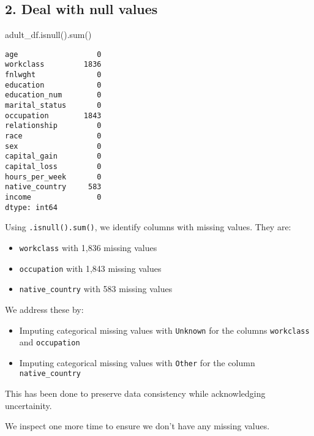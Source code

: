 \documentclass[
  letterpaper,
  DIV=11,
  numbers=noendperiod]{scrartcl}
\newenvironment{Shaded}{\begin{snugshade}}{\end{snugshade}}
\newcommand{\BuiltInTok}[1]{\textcolor[rgb]{0.00,0.23,0.31}{#1}}
\newcommand{\NormalTok}[1]{\textcolor[rgb]{0.00,0.23,0.31}{#1}}
\providecommand{\tightlist}{%
  \setlength{\itemsep}{0pt}\setlength{\parskip}{0pt}}
\begin{document}
\subsection{2. Deal with null values}\label{deal-with-null-values}

\begin{Shaded}
\begin{Highlighting}[]
\NormalTok{adult\_df.isnull().}\BuiltInTok{sum}\NormalTok{()}
\end{Highlighting}
\end{Shaded}

\begin{verbatim}
age                  0
workclass         1836
fnlwght              0
education            0
education_num        0
marital_status       0
occupation        1843
relationship         0
race                 0
sex                  0
capital_gain         0
capital_loss         0
hours_per_week       0
native_country     583
income               0
dtype: int64
\end{verbatim}

Using \texttt{.isnull().sum()}, we identify columns with missing values.
They are:

\begin{itemize}
\tightlist
\item
  \texttt{workclass} with 1,836 missing values
\item
  \texttt{occupation} with 1,843 missing values
\item
  \texttt{native\_country} with 583 missing values
\end{itemize}

We address these by:

\begin{itemize}
\tightlist
\item
  Imputing categorical missing values with \texttt{Unknown} for the
  columns \texttt{workclass} and \texttt{occupation}
\item
  Imputing categorical missing values with \texttt{Other} for the column
  \texttt{native\_country}
\end{itemize}

This has been done to preserve data consistency while acknowledging
uncertainity.

We inspect one more time to ensure we don't have any missing values.
\end{document}
